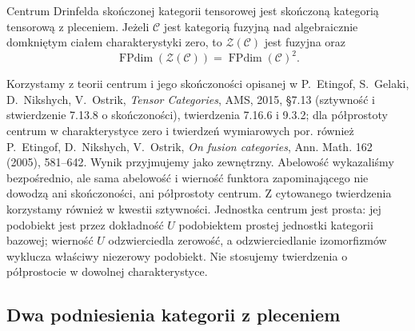 \begin{twierdzenie}\label{cat:thm:tf-center-finite}
Centrum Drinfelda skończonej kategorii tensorowej jest skończoną kategorią tensorową z pleceniem. Jeżeli $\mathcal C$ jest kategorią fuzyjną nad algebraicznie domkniętym ciałem charakterystyki zero, to $\mathcal Z(\mathcal C)$ jest fuzyjna oraz
\[
 \operatorname{FPdim}(\mathcal Z(\mathcal C))
 =\operatorname{FPdim}(\mathcal C)^2.
\]
\end{twierdzenie}

Korzystamy z teorii centrum i jego skończoności opisanej w P.~Etingof, S.~Gelaki, D.~Nikshych, V.~Ostrik, \emph{Tensor Categories}, AMS, 2015, \S7.13 (sztywność i stwierdzenie 7.13.8 o skończoności), twierdzenia 7.16.6 i 9.3.2; dla półprostoty centrum w charakterystyce zero i twierdzeń wymiarowych por. również P.~Etingof, D.~Nikshych, V.~Ostrik, \emph{On fusion categories}, Ann. Math. 162 (2005), 581--642. Wynik przyjmujemy jako zewnętrzny. Abelowość wykazaliśmy bezpośrednio, ale sama abelowość i wierność funktora zapominającego nie dowodzą ani skończoności, ani półprostoty centrum. Z cytowanego twierdzenia korzystamy również w kwestii sztywności. Jednostka centrum jest prosta: jej podobiekt jest przez dokładność $U$ podobiektem prostej jednostki kategorii bazowej; wierność $U$ odzwierciedla zerowość, a odzwierciedlanie izomorfizmów wyklucza właściwy niezerowy podobiekt. Nie stosujemy twierdzenia o półprostocie w dowolnej charakterystyce.

\subsection{Dwa podniesienia kategorii z pleceniem}

